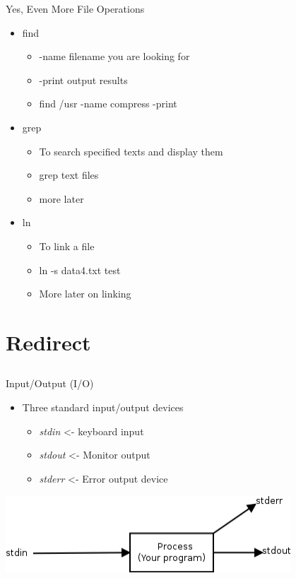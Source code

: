 \documentclass{beamer}
\begin{document}
\begin{frame}{Yes, Even More File Operations}
\begin{itemize}
\item find
\begin{itemize}
\item -name	filename you are looking for
\item -print	output results
\item find /usr -name compress -print
\end{itemize}
\item grep
\begin{itemize}
\item To search specified texts and display them
\item grep text files
\item more later
\end{itemize}
\item ln
\begin{itemize}
\item To link a file
\item ln -s data4.txt test
\item More later on linking
\end{itemize}
\end{itemize}
\end{frame}

\section{Redirect}
\subsection{}
\begin{frame}{Input/Output (I/O)}
\begin{itemize}
\item Three standard input/output devices
\begin{itemize}
\item \textit{stdin} <- keyboard input
\item \textit{stdout} <- Monitor output
\item \textit{stderr} <- Error output device
\end{itemize}
\end{itemize}
\includegraphics[width=0.8\textwidth]{../imgs/input-output.png}
\end{frame}
\end{document}
